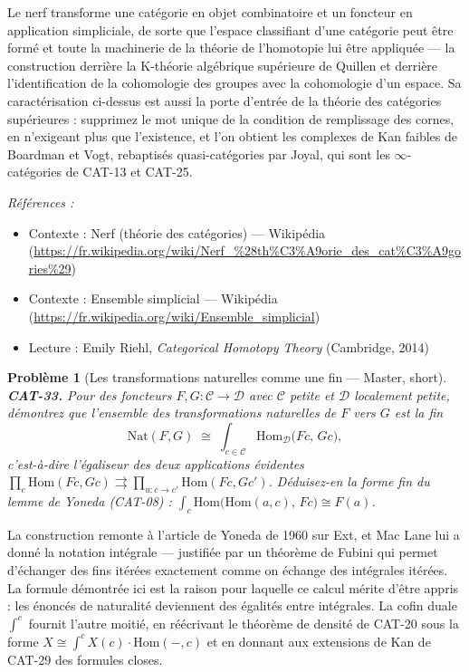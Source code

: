 \documentclass[11pt]{article}
\newtheorem{problem}{Problème}
\newenvironment{refs}{\par\small\noindent\emph{Références :}\begin{itemize}\setlength\itemsep{0pt}}{\end{itemize}\normalsize}
\begin{document}
\noindent Le nerf transforme une catégorie en objet combinatoire et un foncteur en
application simpliciale, de sorte que l'espace classifiant d'une catégorie peut être formé et
toute la machinerie de la théorie de l'homotopie lui être appliquée --- la construction derrière la
K-théorie algébrique supérieure de Quillen et derrière l'identification de la cohomologie des
groupes avec la cohomologie d'un espace. Sa caractérisation ci-dessus est aussi la porte d'entrée
de la théorie des catégories supérieures : supprimez le mot \og{} unique \fg{} de la condition de
remplissage des cornes, en n'exigeant plus que l'existence, et l'on obtient les complexes de Kan
faibles de Boardman et Vogt, rebaptisés quasi-catégories par Joyal, qui sont les $\infty$-catégories de
CAT-13 et CAT-25.

\begin{refs}
\item Contexte : Nerf (théorie des catégories) --- Wikipédia (\url{https://fr.wikipedia.org/wiki/Nerf_%28th%C3%A9orie_des_cat%C3%A9gories%29})
\item Contexte : Ensemble simplicial --- Wikipédia (\url{https://fr.wikipedia.org/wiki/Ensemble_simplicial})
\item Lecture : Emily Riehl, \textit{Categorical Homotopy Theory} (Cambridge, 2014)
\end{refs}

\bigskip

\begin{problem}[{Les transformations naturelles comme une fin --- Master, short}]
\textbf{CAT-33.} Pour des foncteurs $ F, G \colon \mathcal{C} \to \mathcal{D} $
avec $ \mathcal{C} $ petite et $ \mathcal{D} $ localement petite, démontrez que l'ensemble des
transformations naturelles de $ F $ vers $ G $ est la fin
\[ \mathrm{Nat}(F, G) \;\cong\; \int_{c \in \mathcal{C}} \mathrm{Hom}_{\mathcal{D}}\bigl(F c,\, G c\bigr), \]
c'est-à-dire l'égaliseur des deux applications évidentes
$ \prod_{c} \mathrm{Hom}(Fc, Gc) \rightrightarrows \prod_{u \colon c \to c'} \mathrm{Hom}(Fc, Gc') $.
Déduisez-en la forme \og{} fin \fg{} du lemme de Yoneda (CAT-08) :
$ \int_{c} \mathrm{Hom}\bigl( \mathrm{Hom}(a, c),\, F c \bigr) \cong F(a) $.
\end{problem}

\noindent La construction remonte à l'article de Yoneda de 1960 sur Ext, et Mac Lane lui
a donné la notation intégrale --- justifiée par un théorème de Fubini qui permet d'échanger des fins
itérées exactement comme on échange des intégrales itérées. La formule démontrée ici est la raison
pour laquelle ce calcul mérite d'être appris : les énoncés de naturalité deviennent des égalités
entre intégrales. La cofin duale $ \int^{c} $ fournit l'autre moitié, en réécrivant le théorème
de densité de CAT-20 sous la forme $ X \cong \int^{c} X(c) \cdot \mathrm{Hom}(-, c) $ et en
donnant aux extensions de Kan de CAT-29 des formules closes.
\end{document}
